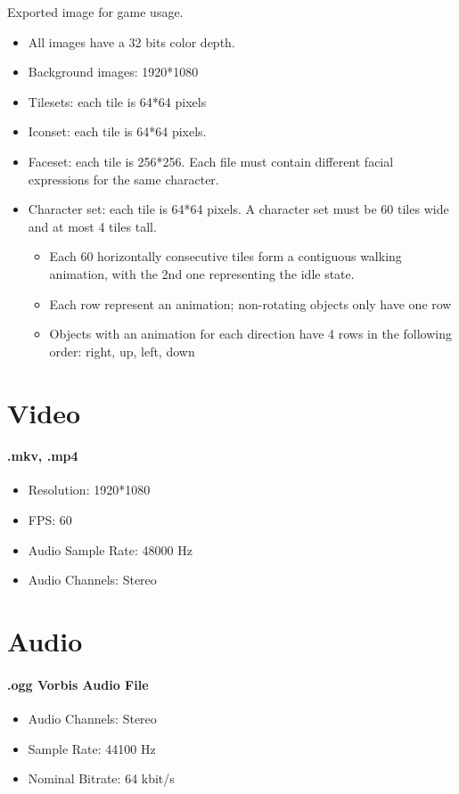 Exported image for game usage.
\begin{itemize}
	\item All images have a 32 bits color depth.
	\item Background images: 1920*1080
	\item Tilesets: each tile is 64*64 pixels
	\item Iconset: each tile is 64*64 pixels.
	\item Faceset: each tile is 256*256. Each file must contain different facial expressions for the same character.
	\item  Character set: each tile is 64*64 pixels. A character set must be 60 tiles wide and at most 4 tiles tall.
		\begin{itemize}
			\item Each 60 horizontally consecutive tiles form a contiguous walking animation, with the 2nd one representing the idle state. 
			\item Each row represent an animation; non-rotating objects only have one row
			\item Objects with an animation for each direction have 4 rows in the following order: right, up, left, down
		\end{itemize}
\end{itemize}


\section{Video }
\paragraph{.mkv, .mp4}
		\begin{itemize}
			\item Resolution: 1920*1080
			\item FPS: 60
			\item Audio Sample Rate: 48000 Hz
			\item Audio Channels: Stereo
		\end{itemize}


\section{Audio }
\paragraph{.ogg Vorbis Audio File}
		\begin{itemize}
			\item Audio Channels: Stereo
			\item Sample Rate: 44100 Hz
			\item Nominal Bitrate: 64 kbit/s
		\end{itemize}

